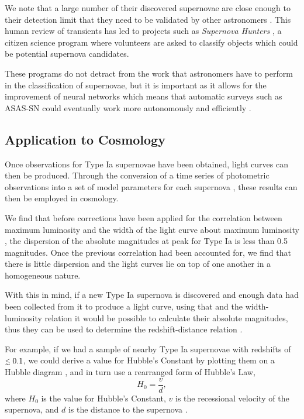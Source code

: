 \documentclass[twocolumn]{revtex4}
\begin{document}
We note that a large number of their discovered supernovae are close enough to their detection limit that they need to be validated by other astronomers \cite{asn_lc}. This human review of transients has led to projects such as \textit{Supernova Hunters} \cite{cit-sci}, a citizen science program where volunteers are asked to classify objects which could be potential supernova candidates.  

These programs do not detract from the work that astronomers have to perform in the classification of supernovae, but it is important as it allows for the improvement of neural networks which means that automatic surveys such as ASAS-SN could eventually work more autonomously and efficiently \cite{cit-sci}.  

\vspace{-3ex}
\subsection{Application to Cosmology} \label{appcosmo}
\vspace{-2ex}
Once observations for Type Ia supernovae have been obtained, light curves can then be produced. Through the conversion of a time series of photometric observations into a set of model parameters for each supernova \cite{sn_consts}, these results can then be employed in cosmology. 

We find that before corrections have been applied for the correlation between maximum luminosity and the width of the light curve about maximum luminosity \cite{longair, abs_phil}, the dispersion of the absolute magnitudes at peak for Type Ia is less than 0.5 magnitudes. Once the previous correlation had been accounted for, we find that there is little dispersion and the light curves lie on top of one another in a homogeneous nature. 

With this in mind, if a new Type Ia supernova is discovered and enough data had been collected from it to produce a light curve, using that and the width-luminosity relation it would be possible to calculate their absolute magnitudes, thus they can be used to determine the redshift-distance relation \cite{mod_ast}.

For example, if we had a sample of nearby Type Ia supernovae with redshifts of $\mathrel{\mathsmaller{\lesssim}} 0.1$, we could derive a value for Hubble's Constant by plotting them on a Hubble diagram \cite{exp_uni_sn}, and in turn use a rearranged form of Hubble's Law,
\begin{equation}
H_0 = \frac{v}{d}, 
\label{eqn:h_0}
\end{equation}
where $H_0$ is the value for Hubble's Constant, $v$ is the recessional velocity of the supernova, and $d$ is the distance to the supernova \cite{mod_ast}. 
\end{document}
